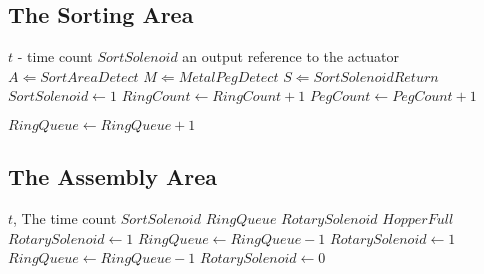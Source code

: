\documentclass[12pt]{article}
\makeatletter
\newcommand*{\currentname}{\@currentlabelname}
\makeatother
\begin{document}
  \subsection{The Sorting Area}
    \begin{algorithm}[H]
      \caption{\currentname}
      \begin{algorithmic}
        \REQUIRE $t$ - time count
        \REQUIRE $SortSolenoid$ an output reference to the actuator
        \STATE $A \Leftarrow SortAreaDetect$
        \STATE $M \Leftarrow MetalPegDetect$
        \STATE $S \Leftarrow SortSolenoidReturn$
            \STATE $SortSolenoid \leftarrow 1$
            \STATE $RingCount \leftarrow RingCount + 1$
            \ELSE
              \STATE $PegCount \leftarrow PegCount + 1$
            \ENDIF
          \ENDIF

            \STATE $RingQueue \leftarrow RingQueue + 1$
          \ENDIF
        \ENDWHILE
      \end{algorithmic}
    \end{algorithm}

  \subsection{The Assembly Area}
    \begin{algorithm}[H]
      \caption{\currentname}
      \begin{algorithmic}
        \REQUIRE $t$, The time count
        \REQUIRE $SortSolenoid$
        \REQUIRE $RingQueue$
        \REQUIRE $RotarySolenoid$
        \REQUIRE $HopperFull$
            \STATE $RotarySolenoid \leftarrow 1$
            \STATE $RingQueue \leftarrow RingQueue - 1$
            \STATE $RotarySolenoid \leftarrow 1$
            \STATE $RingQueue \leftarrow RingQueue - 1$
          \ELSE
            \STATE $RotarySolenoid \leftarrow 0$
          \ENDIF
        \ENDWHILE
      \end{algorithmic}
    \end{algorithm}
\end{document}

